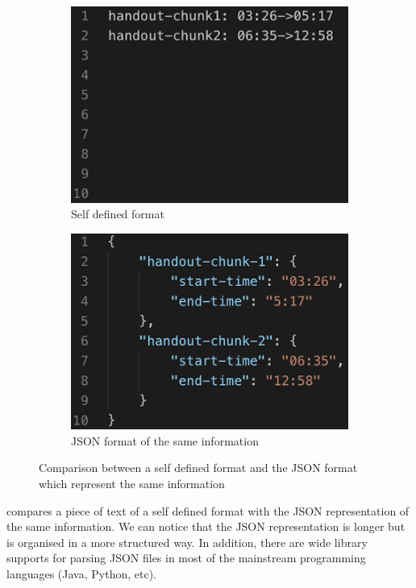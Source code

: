 \begin{figure}[!htb]
  \centering
  \begin{subfigure}{.45\textwidth}
    \includegraphics[width=\textwidth]{txt-example.png}
    \caption{Self defined format}
  \end{subfigure}
  \begin{subfigure}{.45\textwidth}
    \includegraphics[width=\textwidth]{json-example.png}
    \caption{JSON format of the same information}
  \end{subfigure}
  \caption{Comparison between a self defined format and the JSON format which represent the same information}
  \label{fig:txt-json-compare}
\end{figure}

 compares a piece of text of a self defined format with the JSON representation of the same information. We can notice that the JSON representation is longer but is organised in a more structured way. In addition, there are wide library supports for parsing JSON files in most of the mainstream programming languages (Java, Python, etc).


